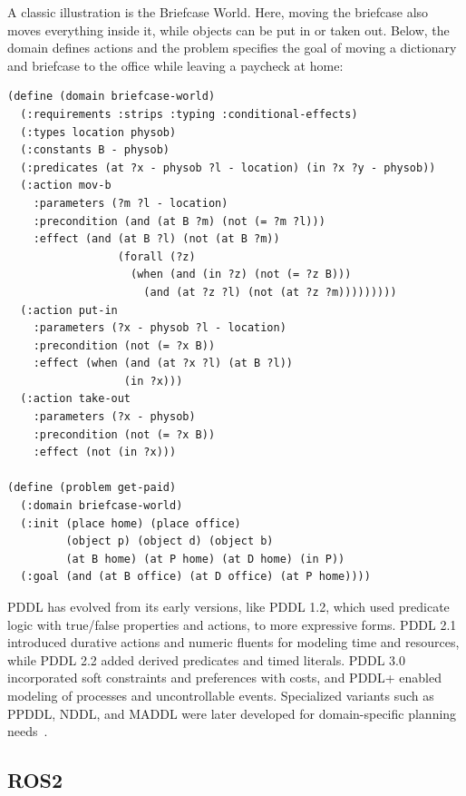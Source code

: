 \documentclass[12pt]{extarticle}
\begin{document}
A classic illustration is the Briefcase World. Here, moving the briefcase also moves everything inside it, while objects can be put in or taken out. Below, the domain defines actions and the problem specifies the goal of moving a dictionary and briefcase to the office while leaving a paycheck at home:

\begin{lstlisting}[language=PDDL]
(define (domain briefcase-world)
  (:requirements :strips :typing :conditional-effects)
  (:types location physob)
  (:constants B - physob)
  (:predicates (at ?x - physob ?l - location) (in ?x ?y - physob))
  (:action mov-b
    :parameters (?m ?l - location)
    :precondition (and (at B ?m) (not (= ?m ?l)))
    :effect (and (at B ?l) (not (at B ?m))
                 (forall (?z)
                   (when (and (in ?z) (not (= ?z B)))
                     (and (at ?z ?l) (not (at ?z ?m)))))))))
  (:action put-in
    :parameters (?x - physob ?l - location)
    :precondition (not (= ?x B))
    :effect (when (and (at ?x ?l) (at B ?l))
                  (in ?x)))
  (:action take-out
    :parameters (?x - physob)
    :precondition (not (= ?x B))
    :effect (not (in ?x)))
                     
(define (problem get-paid)
  (:domain briefcase-world)
  (:init (place home) (place office)
         (object p) (object d) (object b)
         (at B home) (at P home) (at D home) (in P))
  (:goal (and (at B office) (at D office) (at P home))))

\end{lstlisting}

PDDL has evolved from its early versions, like PDDL 1.2, which used predicate logic with true/false properties and actions, to more expressive forms. PDDL 2.1 introduced durative actions and numeric fluents for modeling time and resources, while PDDL 2.2 added derived predicates and timed literals. PDDL 3.0 incorporated soft constraints and preferences with costs, and PDDL+ enabled modeling of processes and uncontrollable events. Specialized variants such as PPDDL, NDDL, and MADDL were later developed for domain-specific planning needs~\cite{pddl}.

\subsection{ROS2}
\end{document}
